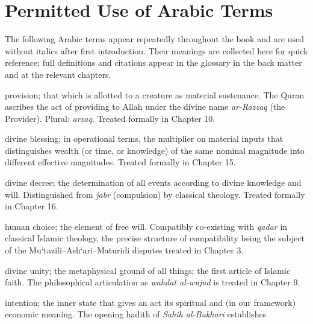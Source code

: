 \chapter*{Permitted Use of Arabic Terms}

The following Arabic terms appear repeatedly throughout the book and
are used without italics after first introduction. Their meanings are
collected here for quick reference; full definitions and citations
appear in the glossary in the back matter and at the relevant
chapters.

\begin{notationbox}
\begin{description}[leftmargin=4cm,style=nextline]
    \item[\textbf{rizq}] provision; that which is allotted to a
        creature as material sustenance. The Quran ascribes the act of
        providing to Allah under the divine name \textit{ar-Razzaq}
        (the Provider). Plural: \textit{arzaq}. Treated formally in
        Chapter 10.
    \item[\textbf{barakah}] divine blessing; in operational terms, the
        multiplier on material inputs that distinguishes wealth (or
        time, or knowledge) of the same nominal magnitude into
        different effective magnitudes. Treated formally in Chapter 15.
    \item[\textbf{qadar}] divine decree; the determination of all
        events according to divine knowledge and will. Distinguished
        from \textit{jabr} (compulsion) by classical theology.
        Treated formally in Chapter 16.
    \item[\textbf{ikhtiyar}] human choice; the element of free will.
        Compatibly co-existing with \textit{qadar} in classical
        Islamic theology, the precise structure of compatibility being
        the subject of the Mu`tazili--Ash`ari--Maturidi disputes
        treated in Chapter 3.
    \item[\textbf{tawhid}] divine unity; the metaphysical ground of
        all things; the first article of Islamic faith. The
        philosophical articulation as \textit{wahdat al-wujud} is
        treated in Chapter 9.
    \item[\textbf{niyyah}] intention; the inner state that gives an
        act its spiritual and (in our framework) economic meaning.
        The opening hadith of \textit{Sahih al-Bukhari} establishes

\end{description}
\end{notationbox}
